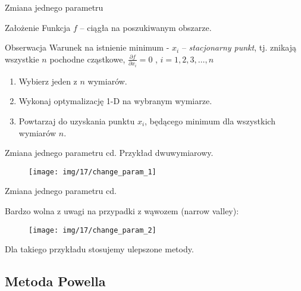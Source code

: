   \begin{frame}{Zmiana jednego parametru}
    \begin{block}{Założenie}
      Funkcja $f$ -- ciągła na poszukiwanym obszarze.
    \end{block}
    \begin{block}{Obserwacja}
        Warunek na istnienie minimum - $ x_i $ -- \emph{stacjonarny punkt},
        tj. znikają wszystkie $n$ pochodne cząstkowe, $ \frac{\partial f}{\partial x_i} = 0 $ , $ i = 1,2,3,\ldots ,n $
    \end{block}
    \begin{block}{}
        \begin{enumerate}
          \item Wybierz jeden z $n$ wymiarów.
          \item Wykonaj optymalizację 1-D na wybranym wymiarze.
          \item Powtarzaj do uzyskania punktu $x_i$, będącego minimum dla wszystkich wymiarów $n$.
        \end{enumerate}
    \end{block}
  \end{frame}

  \begin{frame}{Zmiana jednego parametru cd.}
    Przykład dwuwymiarowy.
	\begin{figure}
		\centering
		\texttt{[image: img/17/change\_param\_1]}
	\end{figure}

  \end{frame}

  \begin{frame}{Zmiana jednego parametru cd.}

	Bardzo wolna z uwagi na przypadki z wąwozem (narrow valley):
	\begin{figure}
		\centering
		\texttt{[image: img/17/change\_param\_2]}
	\end{figure}
	Dla takiego przykładu stosujemy ulepszone metody.

  \end{frame}

\subsection{Metoda Powella}

